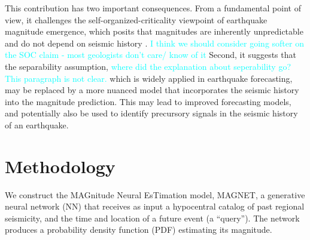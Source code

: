 \documentclass[pdflatex]{sn-jnl}
\newcommand{\neri}[1]{{\textcolor{cyan}{#1}}}
\begin{document}
This contribution has two important consequences. From a fundamental point of view, it challenges the self-organized-criticality viewpoint of earthquake magnitude emergence, which posits that magnitudes are inherently unpredictable and do not depend on seismic history \cite{olami_self-organized_1992, sornette_self-organized_1989, bak_earthquakes_1989, de_geus_scaling_2022}. \neri{I think we should consider going softer on the SOC claim - most geologists don't care/ know of it} Second, it suggests that the separability assumption, \neri{where did the explanation about seperability go? This paragraph is not clear.} which is widely applied in earthquake forecasting, may be replaced by a more nuanced model that incorporates the seismic history into the magnitude prediction. This may lead to improved forecasting models, and potentially also be used to identify precursory signals in the seismic history of an earthquake.



\section{Methodology}
We construct the MAGnitude Neural EsTimation model, MAGNET, a generative neural network (NN) that receives as input a hypocentral catalog of past regional seismicity, and the time and location of a future event (a ``query''). The network produces a probability density function (PDF) estimating its magnitude.

\end{document}
